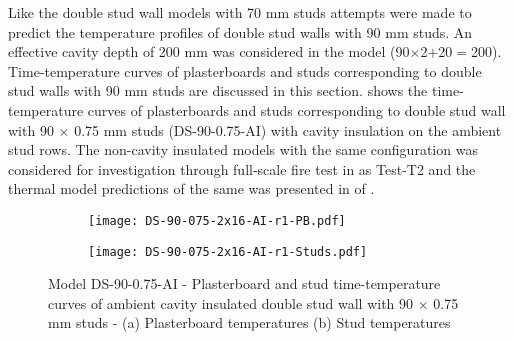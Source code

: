 Like the double stud wall models with 70 mm studs attempts were made to predict the temperature profiles of double stud walls with 90 mm studs. An effective cavity depth of 200 mm was considered in the model (90$\times$2$+$20$=$200). Time-temperature curves of plasterboards and studs corresponding to double stud walls with 90 mm studs are discussed in this section.  shows the time-temperature curves of plasterboards and studs corresponding to double stud wall with 90 $\times$ 0.75 mm studs (DS-90-0.75-AI) with cavity insulation on the ambient stud rows. The non-cavity insulated models with the same configuration was considered for investigation through full-scale fire test in  as Test-T2 and the thermal model predictions of the same was presented in  of .
\begin{figure}[!htbp]
	\centering
	\begin{subfigure}[b]{0.6\textwidth}
		\centering
		\texttt{[image: DS-90-075-2x16-AI-r1-PB.pdf]}
		\caption{}
		\label{subfig:DS-90-075-2x16-AI-r1-PB}
	\end{subfigure}
	\begin{subfigure}[b]{0.6\textwidth}
		\centering
		\texttt{[image: DS-90-075-2x16-AI-r1-Studs.pdf]}
		\caption{}
		\label{subfig:DS-90-075-2x16-AI-r1-Studs}
	\end{subfigure}
	   \caption{Model DS-90-0.75-AI - Plasterboard and stud time-temperature curves of ambient cavity insulated double stud wall with 90 $\times$ 0.75 mm studs - (a) Plasterboard temperatures (b) Stud temperatures}
	   \label{fig:DS-90-075-2x16-AI-r1}
\end{figure}

